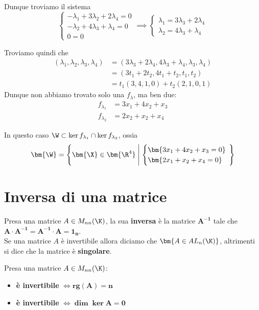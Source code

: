 \documentclass[11pt, a4paper, titlepage, oneside]{scrbook}
\begin{document}
Dunque troviamo il sistema
\[
\begin{cases}
-\lambda_1 + 3\lambda_2 + 2\lambda_4 = 0 \\
-\lambda_2 + 4\lambda_3 + \lambda_4 = 0 \\
0 = 0 
\end{cases}
\implies
\begin{cases}
    \lambda_1 = 3 \lambda_3 + 2 \lambda_4 \\
    \lambda_2 = 4\lambda_3 +  \lambda_4
\end{cases}
\]

Troviamo quindi che 
\begin{align*}
(\lambda_1, \lambda_2, \lambda_3, \lambda_4) &= (3\lambda_3 + 2 \lambda_4, 4\lambda_3 + \lambda_4, \lambda_3, \lambda_4) \\
 &= (3t_1 + 2t_2, 4t_1 + t_2, t_1, t_2) \\
 &= t_1 (3,4,1,0) + t_2 (2,1,0,1)
\end{align*}
Dunque non abbiamo trovato solo una $f_\lambda$, ma ben due:
\begin{align*}
f_{\lambda_1} &= 3x_1 + 4x_2 + x_3  \\
f_{\lambda_2} &= 2x_2 + x_2 + x_4 
\end{align*}

In questo caso $\W \subset \ker f_{\lambda_1} \cap \ker f_{\lambda_2}$, ossia 
\[ \bm{\W} = 
\left\{\bm{\X} \in \bm{\R^4} \;\middle|\; \begin{cases}
\bm{3 x_1 + 4x_2 + x_3 = 0} \\
\bm{2x_1 + x_2 + x_4 = 0}
\end{cases}
\! \! \! \!
\right\}
\]

\section{Inversa di una matrice}

\begin{Definizione}
\label{def-inversa}
Presa una matrice $A \in M_{nn}(\K)$, la sua \textbf{inversa} è la matrice $\bm{A^{-1}}$ tale che $\bm{A \cdot A^{-1} = A^{-1} \cdot A = 1_n}$. \\
Se una matrice $A$ è invertibile allora diciamo che $\bm{A \in AL_n(\K)}$, altrimenti si dice che la matrice è \textbf{singolare}.
\end{Definizione}

\begin{Proposizione}
\label{propos-invertibilità-matrice}
Presa una matrice $A \in M_{nn}(\K)$: 
\begin{itemize}
    \item \textbf{è invertibile} $\iff \bm{rg(A) = n}$
    \item \textbf{è invertibile} $\iff \bm{\dim \ker A = 0}$
\end{itemize}
\end{Proposizione}
\end{document}
